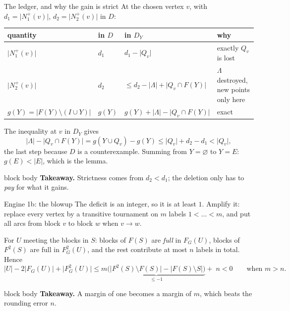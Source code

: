 \documentclass[aspectratio=169,11pt]{beamer}
\newcommand{\abs}[1]{\lvert #1\rvert}
\newcommand{\takeaway}[1]{%
  \vfill
  \begin{beamercolorbox}[wd=\dimexpr\textwidth-9pt\relax,sep=4pt,rounded=true]{block body}
    \footnotesize\color{mainblue}\textbf{Takeaway.} \color{black}#1
  \end{beamercolorbox}}
\begin{document}
\begin{frame}{The ledger, and why the gain is strict}
  \small
  At the chosen vertex $v$, with $d_1=\abs{N_1^+(v)}$, $d_2=\abs{N_2^+(v)}$ in $D$:
  \begin{center}
  \renewcommand{\arraystretch}{1.25}
  \begin{tabular}{@{}llll@{}}
  \toprule
  quantity & in $D$ & in $D_Y$ & why \\
  \midrule
  $\abs{N_1^+(v)}$ & $d_1$ & $d_1-\abs{Q_v}$ & exactly $Q_v$ is lost \\
  $\abs{N_2^+(v)}$ & $d_2$ & $\le d_2-\abs\Lambda+\abs{Q_v\cap F(Y)}$ & $\Lambda$ destroyed, new points only here \\
  $g(Y)=\abs{F(Y)\setminus(I\cup Y)}$ & $g(Y)$ & $g(Y)+\abs\Lambda-\abs{Q_v\cap F(Y)}$ & exact \\
  \bottomrule
  \end{tabular}
  \end{center}
  \medskip
  The inequality at $v$ in $D_Y$ gives
  \[
    \abs\Lambda-\abs{Q_v\cap F(Y)}=g(Y\cup Q_v)-g(Y)\le\abs{Q_v}+d_2-d_1<\abs{Q_v},
  \]
  the last step because $D$ is a counterexample. Summing from $Y=\varnothing$ to $Y=E$:
  $g(E)<\abs E$, which is the lemma.
  \takeaway{Strictness comes from $d_2<d_1$; the deletion only has to \emph{pay} for what it
  gains.}
\end{frame}

\begin{frame}{Engine 1b: the blowup}
  \small
  The deficit is an integer, so it is at least $1$. Amplify it: replace every vertex by a
  transitive tournament on $m$ labels $1<\dots<m$, and put all arcs from block $v$ to block $w$
  when $v\to w$.
  \medskip
  \centering
  \scalebox{0.62}{}
  \medskip

  For $U$ meeting the blocks in $S$: blocks of $F(S)$ are \emph{full} in $F_G(U)$, blocks of
  $F^2(S)$ are full in $F_G^2(U)$, and the rest contribute at most $n$ labels in total. Hence
  \[
    \abs U-2\abs{F_G(U)}+\abs{F_G^2(U)}
    \le m\underbrace{\bigl(\abs{F^2(S)\setminus F(S)}-\abs{F(S)\setminus S}\bigr)}_{\le-1}+\;n<0
    \qquad\text{when }m>n .
  \]
  \takeaway{A margin of one becomes a margin of $m$, which beats the rounding error $n$.}
\end{frame}
\end{document}
